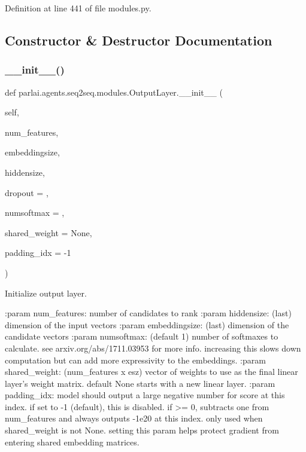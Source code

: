Definition at line 441 of file modules.\+py.



\subsection{Constructor \& Destructor Documentation}
\mbox{\label{classparlai_1_1agents_1_1seq2seq_1_1modules_1_1OutputLayer_ae79d593ea8038932fc431369de1fa91d}} 
\subsubsection{\texorpdfstring{\+\_\+\+\_\+init\+\_\+\+\_\+()}{\_\_init\_\_()}}
{\footnotesize\ttfamily def parlai.\+agents.\+seq2seq.\+modules.\+Output\+Layer.\+\_\+\+\_\+init\+\_\+\+\_\+ (\begin{DoxyParamCaption}\item[{}]{self,  }\item[{}]{num\+\_\+features,  }\item[{}]{embeddingsize,  }\item[{}]{hiddensize,  }\item[{}]{dropout = {},  }\item[{}]{numsoftmax = {},  }\item[{}]{shared\+\_\+weight = {\ttfamily None},  }\item[{}]{padding\+\_\+idx = {\ttfamily -\/1} }\end{DoxyParamCaption})}

\begin{DoxyVerb}Initialize output layer.

:param num_features:  number of candidates to rank
:param hiddensize:    (last) dimension of the input vectors
:param embeddingsize: (last) dimension of the candidate vectors
:param numsoftmax:   (default 1) number of softmaxes to calculate.
              see arxiv.org/abs/1711.03953 for more info.
              increasing this slows down computation but can
              add more expressivity to the embeddings.
:param shared_weight: (num_features x esz) vector of weights to use as
              the final linear layer's weight matrix. default
              None starts with a new linear layer.
:param padding_idx:   model should output a large negative number for
              score at this index. if set to -1 (default),
              this is disabled. if >= 0, subtracts one from
              num_features and always outputs -1e20 at this
              index. only used when shared_weight is not None.
              setting this param helps protect gradient from
              entering shared embedding matrices.
\end{DoxyVerb}
 

